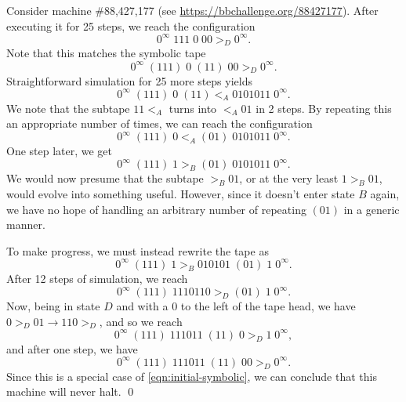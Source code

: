 \begin{example}
Consider machine \#88,427,177 (see \url{https://bbchallenge.org/88427177}).
After executing it for 25 steps, we reach the configuration
\begin{equation}
    0^\infty\; 111\; 0\; 00 >_D 0^\infty.
\end{equation}
Note that this matches the symbolic tape
\begin{equation}
    \label{eqn:initial-symbolic}
    0^\infty\; (111)\; 0\; (11)\; 00 >_D 0^\infty.
\end{equation}
Straightforward simulation for 25 more steps yields
\begin{equation}
    0^\infty\; (111)\; 0\; (11) <_A 0101011\; 0^\infty.
\end{equation}
We note that the subtape $11 <_A$ turns into $<_A 01$ in 2 steps. By repeating
this an appropriate number of times, we can reach the configuration
\begin{equation}
    0^\infty\; (111)\; 0 <_A (01)\; 0101011\; 0^\infty.
\end{equation}
One step later, we get
\begin{equation}
    0^\infty\; (111)\; 1 >_B (01)\; 0101011\; 0^\infty.
\end{equation}
We would now presume that the subtape $>_B 01$, or at the very least $1 >_B 01$,
would evolve into something
useful. However, since it doesn't enter state $B$ again, we have no hope of
handling an arbitrary number of repeating $(01)$ in a generic manner.

To make progress, we must instead rewrite the tape as
\begin{equation}
    0^\infty\; (111)\; 1 >_B 010101\; (01)\; 1\; 0^\infty.
\end{equation}
After 12 steps of simulation, we reach
\begin{equation}
    0^\infty\; (111)\; 1110110 >_D (01)\; 1\; 0^\infty.
\end{equation}
Now, being in state $D$ and with a 0 to the left of the tape head, we have
$0 >_D 01 \rightarrow 110 >_D$, and so we reach
\begin{equation}
    0^\infty\; (111)\; 111011\; (11)\; 0 >_D 1\; 0^\infty,
\end{equation}
and after one step, we have
\begin{equation}
    0^\infty\; (111)\; 111011\; (11)\; 00 >_D 0^\infty.
\end{equation}
Since this is a special case of \eqref{eqn:initial-symbolic}, we can
conclude that this machine will never halt. \qed

\end{example}

